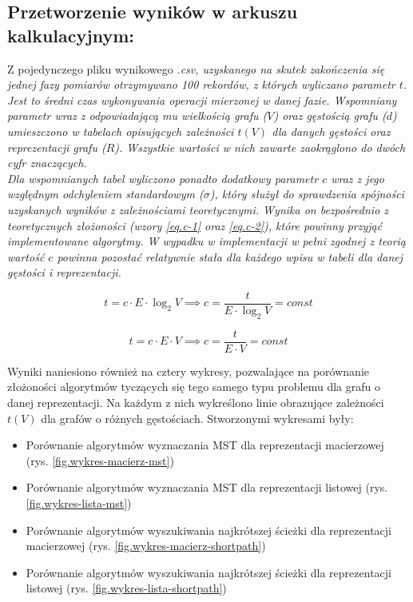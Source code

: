 \documentclass[a4paper,12pt]{article}
\begin{document}
\subsection{Przetworzenie wyników w arkuszu kalkulacyjnym:}
Z pojedynczego pliku wynikowego \it*.csv\rm, uzyskanego na skutek zakończenia się jednej fazy pomiarów otrzymywano 100 rekordów, z których wyliczano parametr $t$. Jest to średni czas wykonywania operacji mierzonej w danej fazie. Wspomniany parametr wraz z odpowiadającą mu wielkością grafu ($V$) oraz gęstością grafu ($d$) umieszczono w tabelach opisujących zależności $t(V)$ dla danych gęstości oraz reprezentacji grafu ($R$). Wszystkie wartości w nich zawarte zaokrąglono do dwóch cyfr znaczących.\\

\noindent	
Dla wspomnianych tabel wyliczono ponadto dodatkowy parametr $c$ wraz z jego względnym odchyleniem standardowym ($\sigma$), który służył do sprawdzenia spójności uzyskanych wyników z zależnościami teoretycznymi. Wynika on bezpośrednio z teoretycznych złożoności (wzory \ref{eq.c-1} oraz \ref{eq.c-2}), które powinny przyjąć implementowane algorytmy. W wypadku w implementacji w pełni zgodnej z teorią wartość $c$ powinna pozostać relatywnie stała dla każdego wpisu w tabeli dla danej gęstości i reprezentacji.

\begin{equation}
	\label{eq.c-1}
	t = c \cdot E \cdot \log_{2}V \implies c = \frac{t}{E \cdot \log_{2}V} = const
\end{equation}

\begin{equation}
	\label{eq.c-2}
	t = c \cdot E \cdot V \implies c = \frac{t}{E \cdot V} = const
\end{equation}
\vspace{1mm}

\noindent
Wyniki naniesiono również na cztery wykresy, pozwalające na porównanie złożoności algorytmów tyczących się tego samego typu problemu dla grafu o danej reprezentacji. Na każdym z nich wykreślono linie obrazujące zależności $t(V)$ dla grafów o różnych gęstościach. Stworzonymi wykresami były:
\begin{itemize}
	\item Porównanie algorytmów wyznaczania MST dla reprezentacji macierzowej (rys. \ref{fig.wykres-macierz-mst})
	\item Porównanie algorytmów wyznaczania MST dla reprezentacji listowej (rys. \ref{fig.wykres-lista-mst})
	\item Porównanie algorytmów wyszukiwania najkrótszej ścieżki dla reprezentacji macierzowej (rys. \ref{fig.wykres-macierz-shortpath})
	\item Porównanie algorytmów wyszukiwania najkrótszej ścieżki dla reprezentacji listowej (rys. \ref{fig.wykres-lista-shortpath})
\end{itemize} 
\end{document}
